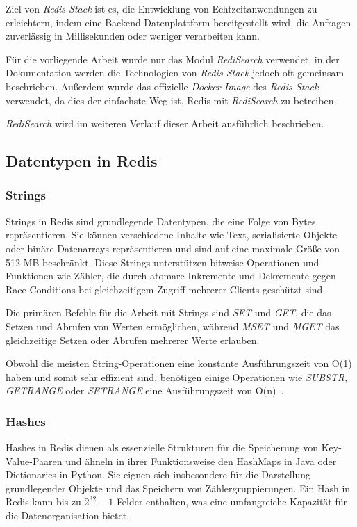Ziel von \emph{Redis Stack} ist es, die Entwicklung von Echtzeitanwendungen zu erleichtern, indem eine Backend-Datenplattform bereitgestellt wird, die Anfragen zuverlässig in Millisekunden oder weniger verarbeiten kann.

Für die vorliegende Arbeit wurde nur das Modul \emph{RediSearch} verwendet, in der Dokumentation werden die Technologien von \emph{Redis Stack} jedoch oft gemeinsam beschrieben. 
Außerdem wurde das offizielle \emph{Docker-Image} des \emph{Redis Stack}~\cite{redis_ltd_run_nodate} verwendet, da dies der einfachste Weg ist, Redis mit \emph{RediSearch} zu betreiben. 

\emph{RediSearch} wird im weiteren Verlauf dieser Arbeit ausführlich beschrieben.

\subsection{Datentypen in Redis}
\subsubsection{Strings}
Strings in Redis sind grundlegende Datentypen, die eine Folge von Bytes repräsentieren.
Sie können verschiedene Inhalte wie Text, serialisierte Objekte oder binäre Datenarrays repräsentieren und sind auf eine maximale Größe von 512 MB beschränkt.
Diese Strings unterstützen bitweise Operationen und Funktionen wie Zähler, die durch atomare Inkremente und Dekremente gegen Race-Conditions bei gleichzeitigem Zugriff mehrerer Clients geschützt sind.

Die primären Befehle für die Arbeit mit Strings sind \emph{SET} und \emph{GET}, die das Setzen und Abrufen von Werten ermöglichen, während \emph{MSET} und \emph{MGET} das gleichzeitige Setzen oder Abrufen mehrerer Werte erlauben.

Obwohl die meisten String-Operationen eine konstante Ausführungszeit von O(1) haben und somit sehr effizient sind, benötigen einige Operationen wie \emph{SUBSTR}, \emph{GETRANGE} oder \emph{SETRANGE} eine Ausführungszeit von O(n)~\cite{redis_ltd_strings_nodate}.

\subsubsection{Hashes}
Hashes in Redis dienen als essenzielle Strukturen für die Speicherung von Key-Value-Paaren und ähneln in ihrer Funktionsweise den HashMaps in Java oder Dictionaries in Python. Sie eignen sich insbesondere für die Darstellung grundlegender Objekte und das Speichern von Zählergruppierungen. Ein Hash in Redis kann bis zu \(2^{32} - 1\) Felder enthalten, was eine umfangreiche Kapazität für die Datenorganisation bietet.


